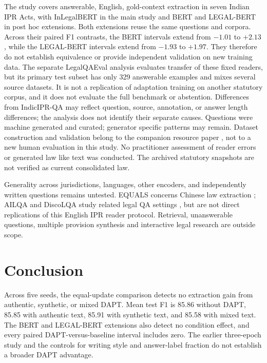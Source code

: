 \documentclass[pdflatex,sn-basic]{sn-jnl}
\begin{document}
The study covers answerable, English, gold-context extraction in seven Indian
IPR Acts, with InLegalBERT in the main study and BERT and LEGAL-BERT in post hoc
extensions. Both extensions reuse the same questions and corpora. Across their
paired F1 contrasts, the BERT intervals extend from $-1.01$ to $+2.13$, while
the LEGAL-BERT intervals extend from $-1.93$ to $+1.97$. They therefore do not
establish equivalence or provide independent validation on new training data.
The separate LegalQAEval analysis evaluates transfer of these fixed readers,
but its primary test subset has only 329 answerable examples and mixes several
source datasets. It is not a replication of adaptation training on another
statutory corpus, and it does not evaluate the full benchmark or abstention.
Differences from IndicIPR-QA may reflect question, source, annotation, or answer
length differences; the analysis does not identify their separate causes.
Questions were machine generated and curated;
generator specific patterns may remain. Dataset construction and validation
belong to the companion resource paper
\citep{anonymous2026indiciprbenchmark}, not to a new human evaluation in this
study. No practitioner assessment of reader errors or generated law like text
was conducted. The archived statutory snapshots are not verified as current
consolidated law.

Generality across jurisdictions, languages, other encoders, and independently
written questions remains untested. EQUALS concerns Chinese law extraction
\citep{chen2023equals}; AILQA and DiscoLQA study related legal QA settings
\citep{nigam2026ailqa,sovrano2025discolqa}, but are not direct replications
of this English IPR reader protocol. Retrieval, unanswerable questions,
multiple provision synthesis and interactive legal research are outside scope.

\section{Conclusion}\label{sec:conclusion}

Across five seeds, the equal-update comparison detects no extraction gain from
authentic, synthetic, or mixed DAPT. Mean test F1 is 85.86 without DAPT, 85.85
with authentic text, 85.91 with synthetic text, and 85.58 with mixed text. The
BERT and LEGAL-BERT extensions also detect no condition effect, and every
paired DAPT-versus-baseline interval includes zero. The earlier three-epoch
study and the controls for writing style and answer-label fraction do not
establish a broader DAPT advantage.
\end{document}
